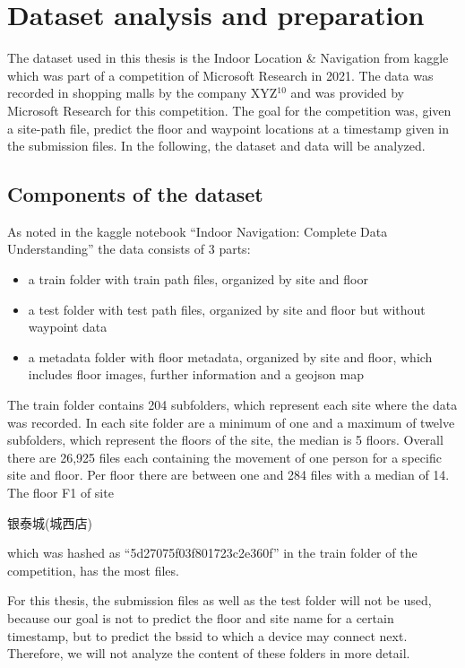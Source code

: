 \chapter{Dataset analysis and preparation}\label{sec:data-ana}

The dataset used in this thesis is the Indoor Location \& Navigation from kaggle\cite{kaggle} which was part of a competition of Microsoft Research in 2021\cite{IndoorLocationNavigation}.
The data was recorded in shopping malls by the company XYZ\(^{10}\) and was provided by Microsoft Research for this competition.
The goal for the competition was, given a site-path file, predict the floor and waypoint locations at a timestamp given in the submission files.
In the following, the dataset and data will be analyzed.


\section{Components of the dataset}\label{sec:data}
As noted in the kaggle notebook ``Indoor Navigation: Complete Data Understanding'' \cite{IndoorNavigationUnderstanding} the data consists of 3 parts:

\begin{itemize}
    \item a train folder with train path files, organized by site and floor
    \item a test folder with test path files, organized by site and floor but without waypoint data
    \item a metadata folder with floor metadata, organized by site and floor, which includes floor images, further information and a geojson map
\end{itemize}

The train folder contains 204 subfolders, which represent each site where the data was recorded.
In each site folder are a minimum of one and a maximum of twelve subfolders, which represent the floors of the site, the median is 5 floors.
Overall there are 26,925 files each containing the movement of one person for a specific site and floor.
Per floor there are between one and 284 files with a median of 14.
The floor F1 of site \begin{CJK*}{UTF8}{gbsn}银泰城(城西店)\end{CJK*} which was hashed as ``5d27075f03f801723c2e360f'' in the train folder of the competition, has the most files.

For this thesis, the submission files as well as the test folder will not be used, because our goal is not to predict the floor and site name for a certain timestamp, but to predict the \ac{bssid} to which a device may connect next.
Therefore, we will not analyze the content of these folders in more detail.

